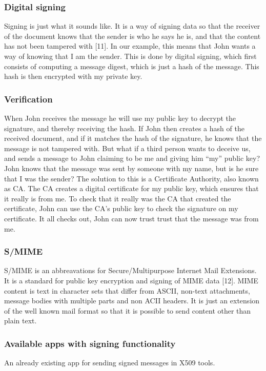 \subsubsection{Digital signing}
Signing is just what it sounds like. It is a way of signing data so that the receiver of the document knows that the sender is
who he says he is, and that the content has not been tampered with [11]. In our example, this means that John wants a way of knowing that I am the sender. This is done by digital signing, which first consists of computing a message digest,
which is just a hash of the message. This hash is then encrypted with my private key.


\subsubsection{Verification}
When John receives the message he will use my public key to decrypt the signature, and thereby receiving the hash. If John then creates a hash of the received document, and if it matches the hash of the signature, he knows that the message is not tampered with. 
\newline
\newline
But what if a third person wants to deceive us, and sends a message to John claiming to be me and giving him “my” public key? John knows that the message was sent by someone with my name, but is he sure that I was the sender? The solution to this is a Certificate Authority, also known as CA. The CA creates a digital certificate for my public key, which ensures that it really is from me. To check that it really was the CA that created the certificate, John can use the CA's public key to check the signature on my certificate. It all checks out, John can now trust trust that the message was from me.

\subsubsection{S/MIME}
S/MIME is an abbreavations for Secure/Multipurpose Internet Mail Extensions. It is a standard for public key encryption and signing of MIME data [12]. MIME content is text in character sets that differ from ASCII, non-text attachments, message bodies with multiple parts and non ACII headers. It is just an extension of the well known mail format so that it is possible to send content other than plain text.

\subsubsection{Available apps with signing functionality}
An already existing app for sending signed messages in X509 tools.

